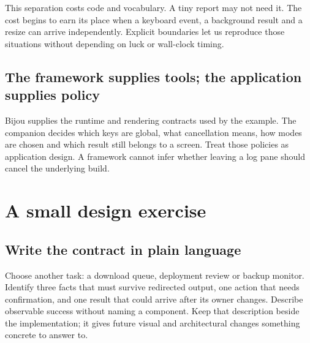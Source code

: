 This separation costs code and vocabulary. A tiny report may not need it. The cost begins to earn its place when a keyboard event, a background result and a resize can arrive independently. Explicit boundaries let us reproduce those situations without depending on luck or wall-clock timing.

\subsection{The framework supplies tools; the application supplies policy}

Bijou supplies the runtime and rendering contracts used by the example. The companion decides which keys are global, what cancellation means, how modes are chosen and which result still belongs to a screen. Treat those policies as application design. A framework cannot infer whether leaving a log pane should cancel the underlying build.

\section{A small design exercise}
\subsection{Write the contract in plain language}

Choose another task: a download queue, deployment review or backup monitor. Identify three facts that must survive redirected output, one action that needs confirmation, and one result that could arrive after its owner changes. Describe observable success without naming a component. Keep that description beside the implementation; it gives future visual and architectural changes something concrete to answer to.
